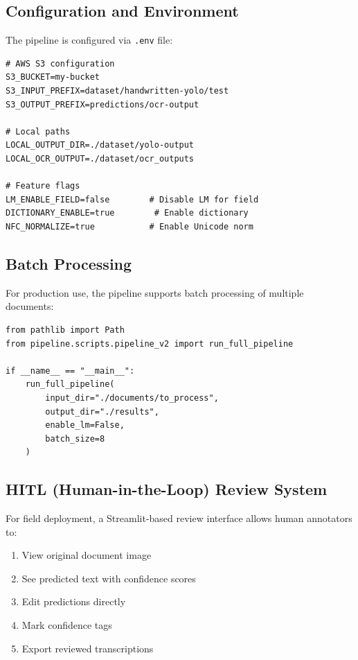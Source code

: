 \documentclass[14pt,a4paper]{article}
\begin{document}
\subsection{Configuration and Environment}

The pipeline is configured via \texttt{.env} file:

\begin{lstlisting}[caption=Pipeline configuration]
# AWS S3 configuration
S3_BUCKET=my-bucket
S3_INPUT_PREFIX=dataset/handwritten-yolo/test
S3_OUTPUT_PREFIX=predictions/ocr-output

# Local paths
LOCAL_OUTPUT_DIR=./dataset/yolo-output
LOCAL_OCR_OUTPUT=./dataset/ocr_outputs

# Feature flags
LM_ENABLE_FIELD=false        # Disable LM for field
DICTIONARY_ENABLE=true        # Enable dictionary
NFC_NORMALIZE=true           # Enable Unicode norm
\end{lstlisting}

\subsection{Batch Processing}

For production use, the pipeline supports batch processing of multiple documents:

\begin{lstlisting}[caption=Full pipeline entry point]
from pathlib import Path
from pipeline.scripts.pipeline_v2 import run_full_pipeline

if __name__ == "__main__":
    run_full_pipeline(
        input_dir="./documents/to_process",
        output_dir="./results",
        enable_lm=False,
        batch_size=8
    )
\end{lstlisting}

\subsection{HITL (Human-in-the-Loop) Review System}

For field deployment, a Streamlit-based review interface allows human annotators to:
\begin{enumerate}
    \item View original document image
    \item See predicted text with confidence scores
    \item Edit predictions directly
    \item Mark confidence tags
    \item Export reviewed transcriptions
\end{enumerate}
\end{document}

